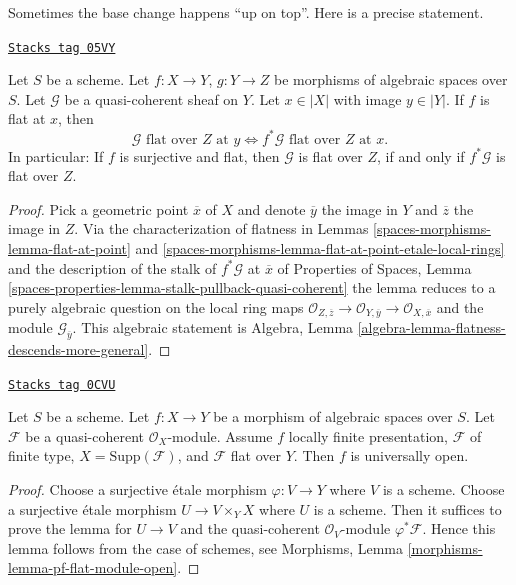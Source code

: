 Sometimes the base change happens ``up on top''. Here is a precise statement.

\begin{lemma}
\label{spaces-morphisms-lemma-flat-permanence}
\href{https://stacks.math.columbia.edu/tag/05VY}{\texttt{Stacks tag 05VY}}

Let $S$ be a scheme. Let $f : X \to Y$, $g : Y \to Z$ be morphisms of
algebraic spaces over $S$. Let $\mathcal{G}$ be a quasi-coherent sheaf on $Y$.
Let $x \in |X|$ with image $y \in |Y|$.
If $f$ is flat at $x$, then
$$
\mathcal{G}\text{ flat over }Z\text{ at }y
\Leftrightarrow
f^*\mathcal{G}\text{ flat over }Z\text{ at }x.
$$
In particular: If $f$ is surjective and flat, then
$\mathcal{G}$ is flat over $Z$, if and only if
$f^*\mathcal{G}$ is flat over $Z$.
\end{lemma}

\begin{proof}
Pick a geometric point $\overline{x}$ of $X$ and denote
$\overline{y}$ the image in $Y$ and $\overline{z}$ the image in $Z$.
Via the characterization of flatness in
Lemmas \ref{spaces-morphisms-lemma-flat-at-point} and
\ref{spaces-morphisms-lemma-flat-at-point-etale-local-rings}
and the description of the stalk of $f^*\mathcal{G}$ at $\overline{x}$ of
Properties of Spaces,
Lemma \ref{spaces-properties-lemma-stalk-pullback-quasi-coherent}
the lemma reduces to a purely algebraic question on the local
ring maps
$\mathcal{O}_{Z, \overline{z}} \to \mathcal{O}_{Y, \overline{y}}
\to \mathcal{O}_{X, \overline{x}}$
and the module $\mathcal{G}_{\overline{y}}$.
This algebraic statement is
Algebra, Lemma \ref{algebra-lemma-flatness-descends-more-general}.
\end{proof}

\begin{lemma}
\label{spaces-morphisms-lemma-pf-flat-module-open}
\href{https://stacks.math.columbia.edu/tag/0CVU}{\texttt{Stacks tag 0CVU}}

Let $S$ be a scheme.
Let $f : X \to Y$ be a morphism of algebraic spaces over $S$.
Let $\mathcal{F}$ be a quasi-coherent $\mathcal{O}_X$-module.
Assume $f$ locally finite presentation, $\mathcal{F}$ of
finite type, $X = \text{Supp}(\mathcal{F})$, and
$\mathcal{F}$ flat over $Y$. Then $f$ is universally open.
\end{lemma}

\begin{proof}
Choose a surjective \'etale morphism $\varphi : V \to Y$ where $V$ is a scheme.
Choose a surjective \'etale morphism $U \to V \times_Y X$ where $U$ is a scheme.
Then it suffices to prove the lemma for $U \to V$ and the quasi-coherent
$\mathcal{O}_V$-module $\varphi^*\mathcal{F}$.
Hence this lemma follows from the case of schemes, see
Morphisms, Lemma \ref{morphisms-lemma-pf-flat-module-open}.
\end{proof}

